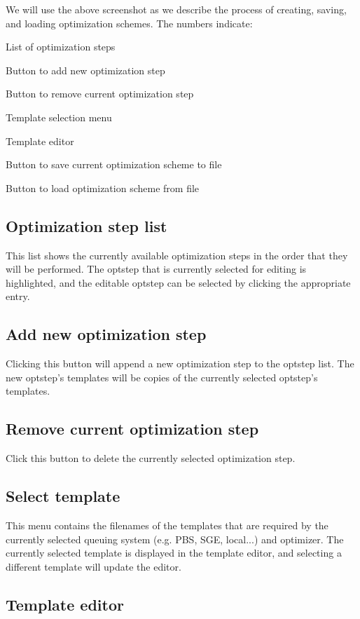 We will use the above screenshot as we describe the process of creating, saving, and loading optimization schemes. The numbers indicate\-:


\begin{DoxyEnumerate}
\item List of optimization steps
\item Button to add new optimization step
\item Button to remove current optimization step
\item Template selection menu
\item Template editor
\item Button to save current optimization scheme to file
\item Button to load optimization scheme from file
\end{DoxyEnumerate}\hypertarget{optschemes_gui-list}{}\subsection{Optimization step list}\label{optschemes_gui-list}
This list shows the currently available optimization steps in the order that they will be performed. The optstep that is currently selected for editing is highlighted, and the editable optstep can be selected by clicking the appropriate entry.\hypertarget{optschemes_gui-add}{}\subsection{Add new optimization step}\label{optschemes_gui-add}
Clicking this button will append a new optimization step to the optstep list. The new optstep's templates will be copies of the currently selected optstep's templates.\hypertarget{optschemes_gui-rem}{}\subsection{Remove current optimization step}\label{optschemes_gui-rem}
Click this button to delete the currently selected optimization step.\hypertarget{optschemes_gui-tselect}{}\subsection{Select template}\label{optschemes_gui-tselect}
This menu contains the filenames of the templates that are required by the currently selected queuing system (e.\-g. P\-B\-S, S\-G\-E, local...) and optimizer. The currently selected template is displayed in the template editor, and selecting a different template will update the editor.\hypertarget{optschemes_gui-editor}{}\subsection{Template editor}\label{optschemes_gui-editor}
